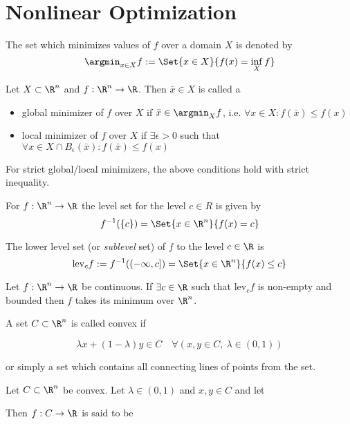 \section{Nonlinear Optimization}\label{d1c9db1}

\label{b27e478}

The set which minimizes values of $f$ over a domain $X$ is denoted by
$$
	\argmin_{x\in X}f:=\Set{x\in X}{f(x)=\inf_Xf}
$$

\label{bc7900e}

Let $X\subset\R^n$ and $f:\R^n\to\R$. Then $\bar x\in X$ is called a
\begin{itemize}
	\item global minimizer of $f$ over $X$ if $\bar x\in\argmin_Xf$,
	      i.e. $\forall x\in X:f(\bar x)\leq f(x)$
	\item local minimizer of $f$ over $X$ if $\exists\epsilon>0$ such
	      that $\forall x\in X\cap B_\epsilon(\bar x):f(\bar x)\leq f(x)$
\end{itemize}
For strict global/local minimizers, the above conditions hold with
strict inequality.

\label{d6589cc}

For $f:\R^n\to\R$ the level set for the level $c\in R$ is given by
$$
	f^{-1}(\{c\})=\Set{x\in\R^n}{f(x)=c}
$$

The lower level set (or \textit{sublevel} set) of $f$ to the level
$c\in\R$ is
$$
	\text{lev}_cf:=f^{-1}((-\infty,c])=\Set{x\in\R^n}{f(x)\leq c}
$$

\label{bd1eec0}

Let $f:\R^n\to\R$ be continuous. If $\exists c\in\R$ such that
$\text{lev}_cf$ is non-empty and bounded then $f$ takes its minimum
over $\R^n$.

\label{e012971}

A set $C\subset\R^n$ is called convex if

$$
	\lambda x+(1-\lambda)y\in C\quad
	\forall(x,y\in C,\ \lambda\in(0,1))
$$

or simply a set which contains all connecting lines of points from the
set.

\label{a114065}

Let $C\subset\R^n$ be convex. Let $\lambda\in(0,1)$ and $x,y\in C$ and
let

Then $f:C\to\R$ is said to be

